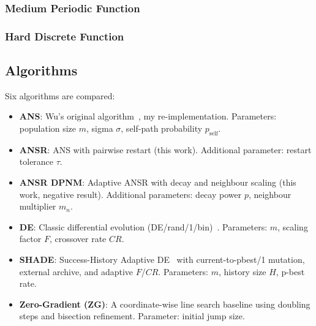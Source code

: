 \documentclass[11pt,a4paper]{article}
\begin{document}
\subsubsection{Medium Periodic Function}


\subsubsection{Hard Discrete Function}


\subsection{Algorithms}

Six algorithms are compared:
\begin{itemize}
    \item \textbf{ANS}: Wu's original algorithm~\cite{wu2015ans}, my re-implementation. Parameters: population size $m$, sigma $\sigma$, self-path probability $p_{\text{self}}$.
    \item \textbf{ANSR}: ANS with pairwise restart (this work). Additional parameter: restart tolerance $\tau$.
    \item \textbf{ANSR DPNM}: Adaptive ANSR with decay and neighbour scaling (this work, negative result). Additional parameters: decay power $p$, neighbour multiplier $m_n$.
    \item \textbf{DE}: Classic differential evolution (DE/rand/1/bin)~\cite{storn1997de}. Parameters: $m$, scaling factor $F$, crossover rate $CR$.
    \item \textbf{SHADE}: Success-History Adaptive DE~\cite{tanabe2013shade} with current-to-pbest/1 mutation, external archive, and adaptive $F$/$CR$. Parameters: $m$, history size $H$, p-best rate.
    \item \textbf{Zero-Gradient (ZG)}: A coordinate-wise line search baseline using doubling steps and bisection refinement. Parameter: initial jump size.
\end{itemize}
\end{document}
